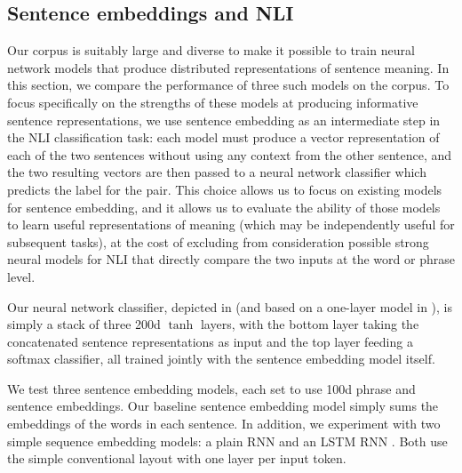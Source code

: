
\subsection{Sentence embeddings and NLI}\label{sentence-embedding}

Our corpus is suitably large and diverse to make it possible to train neural network models that produce distributed representations of sentence meaning. In this section, we compare the performance of three such models on the corpus. To focus specifically on the strengths of these models at producing informative sentence representations, we use sentence embedding as an intermediate step in the NLI classification task: each model must produce a vector representation of each of the two sentences without using any context from the other sentence, and the two resulting vectors are then passed to a neural network classifier which predicts the label for the pair. This choice allows us to focus on existing models for sentence embedding, and it allows us to evaluate the ability of those models to learn useful representations of meaning (which may be independently useful for subsequent tasks), at the cost of excluding from consideration possible strong neural models for NLI that directly compare the two inputs at the word or phrase level.



Our neural network classifier, depicted in  (and based on a one-layer model in \citealt{Bowman:Potts:Manning:2014}), is simply a stack of three 200d $\tanh$ layers, with the bottom layer taking the concatenated sentence representations as input and the top layer feeding a softmax classifier, all trained jointly with the sentence embedding model itself.

We test three sentence embedding models, each set to use 100d phrase and sentence embeddings. Our baseline sentence embedding model simply sums the embeddings of the words in each sentence. In addition, we experiment with two simple sequence embedding models: a plain RNN and an LSTM RNN \cite{hochreiter1997long}. Both use the simple conventional layout with one layer per input token.

